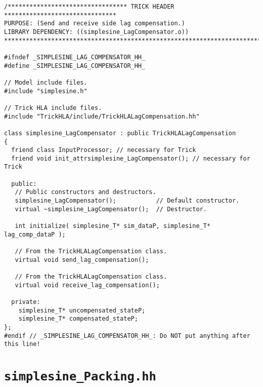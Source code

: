 \begin{lstlisting}[caption={\tt simplesine\_LagCompensator.hh},label={list:simplesine-LagCompensator-hh}]
/********************************* TRICK HEADER *******************************
PURPOSE: (Send and receive side lag compensation.)
LIBRARY DEPENDENCY: ((simplesine_LagCompensator.o))
*******************************************************************************/

#ifndef _SIMPLESINE_LAG_COMPENSATOR_HH_
#define _SIMPLESINE_LAG_COMPENSATOR_HH_

// Model include files.
#include "simplesine.h"

// Trick HLA include files.
#include "TrickHLA/include/TrickHLALagCompensation.hh"

class simplesine_LagCompensator : public TrickHLALagCompensation
{
  friend class InputProcessor; // necessary for Trick
  friend void init_attrsimplesine_LagCompensator(); // necessary for Trick

  public:
   // Public constructors and destructors.
   simplesine_LagCompensator();           // Default constructor.
   virtual ~simplesine_LagCompensator();  // Destructor.

   int initialize( simplesine_T* sim_dataP, simplesine_T* lag_comp_dataP );

   // From the TrickHLALagCompensation class.
   virtual void send_lag_compensation();

   // From the TrickHLALagCompensation class.
   virtual void receive_lag_compensation();

  private:
    simplesine_T* uncompensated_stateP;
    simplesine_T* compensated_stateP;
};
#endif // _SIMPLESINE_LAG_COMPENSATOR_HH_: Do NOT put anything after this line!
\end{lstlisting}

\section{\tt simplesine\_Packing.hh}\label{sec:simplesine-Packing-hh}

